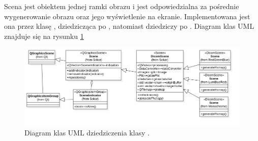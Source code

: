 \label{sec:sokar-dicomscene}

Scena jest obiektem jednej ramki obrazu i jest odpowiedzialna za pośrednie wygenerowanie obrazu oraz jego wyświetlenie na ekranie.
Implementowana jest ona przez klasę , dziedzicząca po , natomiast  dziedziczy po .
Diagram klas UML znajduje się na rysunku \ref{uml:sokar-dicomscene}

\begin{figure}[!htbp]
    \centering
    \includegraphics[width=\textwidth]{img/uml/dicom-scene.png}
    \caption{Diagram klas UML dziedziczenia klasy .}
    \label{uml:sokar-dicomscene}
\end{figure}

